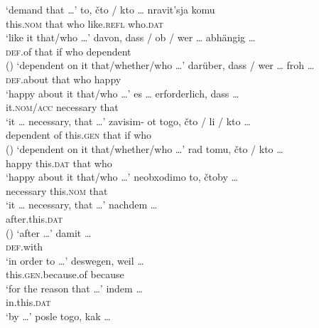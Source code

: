 \documentclass[output=paper]{langscibook}
\begin{document}
    \glt `demand that {\dots}'
    \ex \gll to, čto / kto {\dots} nravit'sja komu \\
    this.\textsc{nom} that {} who {} like.\textsc{refl} who.\textsc{dat} \\
    \glt `like it that/who {\dots}'
\z\ex\label{ex:zimmermann:4.1}
    \ea \gll davon, dass / ob / wer {\dots} abhängig {\dots} \\
    \textsc{def}.of that {} if {} who {} dependent {} \\  \hfill ()
    \glt `dependent on it that/whether/who {\dots}'\largerpage
    \ex \gll darüber, dass / wer {\dots} froh {\dots} \\
    \textsc{def}.about that {} who {} happy {} \\
    \glt `happy about it that/who {\dots}'
    \ex \gll es {\dots} erforderlich, dass {\dots} \\
    it.\textsc{nom/acc} {} necessary that {} \\
    \glt `it {\dots} necessary, that {\dots}'
\z\ex\label{ex:zimmermann:4.2}
    \ea \gll zavisim- ot togo, čto / li / kto {\dots} \\
    dependent of this.\textsc{gen} that {} if {} who {} \\ \hfill ()
    \glt `dependent on it that/whether/who {\dots}'
    \ex \gll rad tomu, čto / kto {\dots} \\
    happy this.\textsc{dat} that {} who {} \\
    \glt `happy about it that/who {\dots}'
    \ex \gll neobxodimo to, čtoby {\dots} \\
    necessary this.\textsc{nom} that {} \\
    \glt `it {\dots} necessary, that {\dots}'
\z\ex\label{ex:zimmermann:5.1}
    \ea \gll nachdem {\dots} \\
    after.this.\textsc{dat} {} \\ \hfill ()
    \glt `after {\dots}'
    \ex \gll damit {\dots} \\
    \textsc{def}.with {} \\
    \glt `in order to {\dots}'
    \ex \gll deswegen, weil {\dots} \\
    this.\textsc{gen}.because.of because {} \\
    \glt `for the reason that {\dots}'
    \ex indem {\dots} \\
    in.this.\textsc{dat} {} \\
    \glt `by {\dots}'
\z\ex\label{ex:zimmermann:5.2}
    \ea \gll posle togo, kak {\dots} \\
\end{document}
